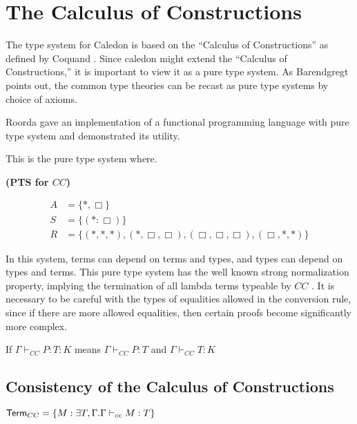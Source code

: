 \section{The Calculus of Constructions}

The type system for Caledon is based on the ``Calculus of Constructions'' as defined by Coquand \citep{coquand1986calculus}.
Since caledon might extend the ``Calculus of Constructions,'' it is important to view it as a pure type system. 
As Barendgregt points out, the common type theories can be recast as pure type systems
by choice of axioms. 

Roorda \citep{roorda2001pure} gave an implementation of a functional programming language with 
pure type system and demonstrated its utility.

This is the pure type system where.

\begin{definition}
\textbf{(PTS for $CC$)}

\begin{align}
A &= \{ *, \Box \}
\\
S &= \{ (* : \Box) \}
\\
R &= \{ (*,*,*),(*,\Box,\Box),(\Box,\Box,\Box),(\Box,*,*)\}
\end{align}  

\label{coc:types}
\end{definition}

In this system, terms can depend on terms and types, 
and types can depend on types and terms.  
This pure type system has the well known strong normalization property, implying the termination of 
all lambda terms typeable by $CC$ \citep{Geuvers94ashort} \citep{geuvers1991modular}.
It is necessary to be careful with the types of equalities allowed in the conversion rule, 
since if there are more allowed equalities, then certain proofs
become significantly more complex.

\begin{definition}
If $\Gamma \vdash_{CC} P : T : K$ means $\Gamma \vdash_{CC} P : T$ and $\Gamma \vdash_{CC} T : K$
\end{definition}


\subsection{Consistency of the Calculus of Constructions}

\begin{definition}
$ \mathsf{Term}_{CC}  = \{ M : \exists T,\Gamma . \Gamma \vdash_{cc} M : T \}$
\end{definition}

